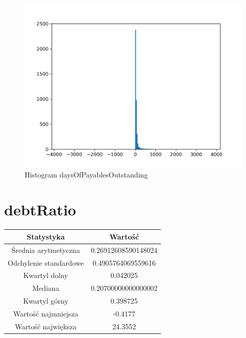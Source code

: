 \documentclass{article}
\begin{document}
\begin{figure}[h!]
    \includegraphics[width=\linewidth]{variables/daysOfPayablesOutstanding.png}
    \caption{Histogram daysOfPayablesOutstanding }
\end{figure}\section{ debtRatio }

\begin{center}
    \begin{tabular}{|c | c|} 
    \hline
    Statystyka & Wartość \\
    \hline\hline
    Średnia arytmetyczna & 0.26912608590148024 \\ 
    \hline
    Odchylenie standardowe & 0.4905764069559616 \\
    \hline
    Kwartyl dolny & 0.042025 \\
    \hline
    Mediana & 0.20700000000000002 \\
    \hline
    Kwartyl górny & 0.398725 \\
    \hline
    Wartość najmniejsza & -0.4177 \\
    \hline
    Wartość największa & 24.3552 \\
    \hline
   \end{tabular}
\end{center}
\end{document}
